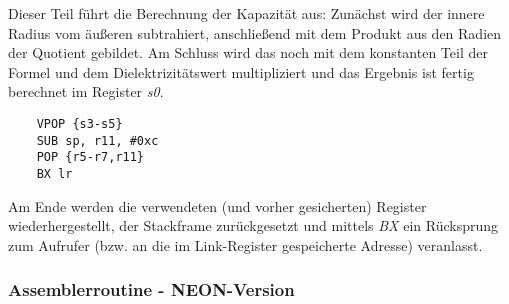 \documentclass[11pt]{scrartcl}
\begin{document}
Dieser Teil führt die Berechnung der Kapazität aus: Zunächst wird der innere Radius vom äußeren subtrahiert, anschließend mit dem Produkt aus den Radien der Quotient gebildet. Am Schluss wird das noch mit dem konstanten Teil der Formel und dem Dielektrizitätswert multipliziert und das Ergebnis ist fertig berechnet im Register \emph{s0}.
\begin{verbatim}
	VPOP {s3-s5}
	SUB sp, r11, #0xc
	POP {r5-r7,r11}
	BX lr
\end{verbatim}
Am Ende werden die verwendeten (und vorher gesicherten) Register wiederhergestellt, der Stackframe zurückgesetzt und mittels \emph{BX} ein Rücksprung zum Aufrufer (bzw. an die im Link-Register gespeicherte Adresse) veranlasst.

\subsubsection{Assemblerroutine - NEON-Version}
\end{document}
